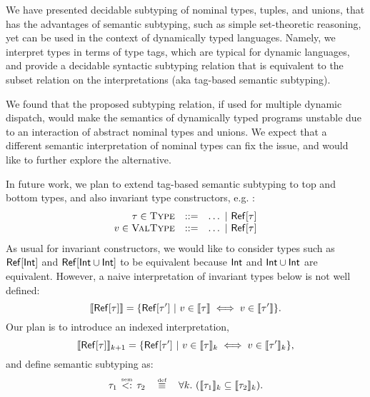 We have presented decidable subtyping of nominal types, tuples, and unions, 
that has the advantages of semantic subtyping, 
such as simple set-theoretic reasoning, 
yet can be used in the context of dynamically typed languages.
Namely, we interpret types in terms of type tags, 
which are typical for dynamic languages,
and provide a decidable syntactic subtyping relation that is
equivalent to the subset relation on the interpretations
(aka tag-based semantic subtyping).

We found that the proposed subtyping relation, 
if used for multiple dynamic dispatch, 
would make the semantics of dynamically typed programs unstable
due to an interaction of abstract nominal types and unions.
We expect that a different semantic interpretation of nominal types 
can fix the issue, and would like to further explore the alternative.

In future work, we plan to extend tag-based semantic subtyping 
to top and bottom types, 
and also invariant type constructors, e.g. :
\[
\begin{array}{rcl}
\tau \in \textsc{Type}   &::=& \ldots ~\vert~ \mathsf{Ref}[\tau]\\
v \in \textsc{ValType} &::=& \ldots ~\vert~ \mathsf{Ref}[\tau]
\end{array}
\]
As usual for invariant constructors, 
we would like to consider types such as $\mathsf{Ref}[\mathsf{Int}]$
and $\mathsf{Ref}[\mathsf{Int} \cup \mathsf{Int}]$ to be equivalent
because $\mathsf{Int}$ and $\mathsf{Int} \cup \mathsf{Int}$ are equivalent.
However, a naive interpretation of invariant types below
is not well defined:
\[
\llbracket \mathsf{Ref}[\tau] \rrbracket = 
\{ \mathsf{Ref}[\tau'] ~\vert~ v \in \llbracket \tau \rrbracket \iff v \in \llbracket \tau' \rrbracket \}.
\]
Our plan is to introduce an indexed interpretation,
\[
\llbracket \mathsf{Ref}[\tau] \rrbracket_{k+1} = \{ \mathsf{Ref}[\tau'] 
    ~\vert~ v \in \llbracket \tau \rrbracket_k \iff v \in \llbracket \tau' \rrbracket_k \},
\]
and define semantic subtyping as:
\[
\bjtruesemsub{\ty_1}{\ty_2} \quad \defsign \quad
\forall k.\ (\interpty{\ty_1}_k \subseteq \interpty{\ty_2}_k).
\]

